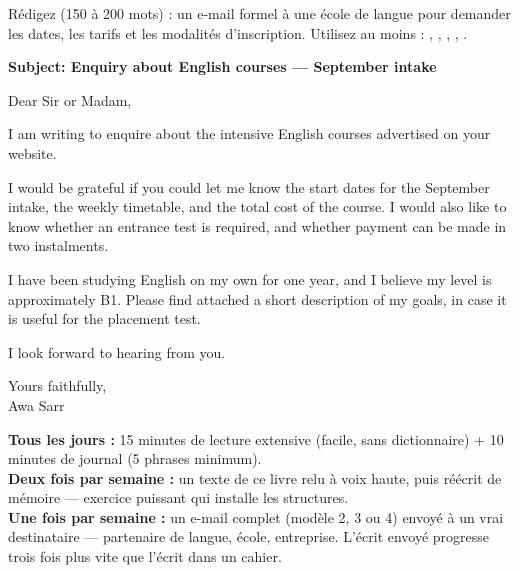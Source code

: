\begin{exo}[17.3 --- Écrivez]
Rédigez (150 à 200 mots) : un e-mail formel à une école de langue pour demander les dates,
les tarifs et les modalités d'inscription. Utilisez au moins :
, ,
, ,
.
\end{exo}
\begin{corrige}
\begin{anglais}
\textbf{Subject: Enquiry about English courses --- September intake}

Dear Sir or Madam,

I am writing to enquire about the intensive English courses advertised on your website.

I would be grateful if you could let me know the start dates for the September intake, the
weekly timetable, and the total cost of the course. I would also like to know whether an
entrance test is required, and whether payment can be made in two instalments.

I have been studying English on my own for one year, and I believe my level is
approximately B1. Please find attached a short description of my goals, in case it is useful
for the placement test.

I look forward to hearing from you.

Yours faithfully,\\
Awa Sarr
\end{anglais}
\end{corrige}

\begin{mission}
\textbf{Tous les jours :} 15 minutes de lecture extensive (facile, sans dictionnaire) +
10 minutes de journal (5 phrases minimum).\\
\textbf{Deux fois par semaine :} un texte de ce livre relu à voix haute, puis réécrit de
mémoire --- exercice puissant qui installe les structures.\\
\textbf{Une fois par semaine :} un e-mail complet (modèle 2, 3 ou 4) envoyé à un vrai
destinataire --- partenaire de langue, école, entreprise. L'écrit envoyé progresse trois
fois plus vite que l'écrit dans un cahier.
\end{mission}
